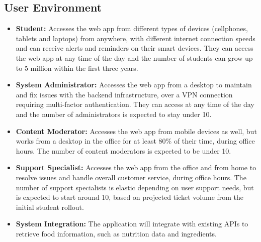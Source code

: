 \documentclass[10pt,letterpaper]{article}
\begin{document}
\subsection{User Environment}
\begin{itemize}[leftmargin=1.5em]
  \item \textbf{Student:} Accesses the web app from different types of devices (cellphones, tablets and laptops) from anywhere, with different internet connection speeds and can receive alerts and reminders on their smart devices. They can access the web app at any time of the day and the number of students can grow up to 5 million within the first three years.
  \item \textbf{System Administrator:} Accesses the web app from a desktop to maintain and fix issues with the backend infrastructure, over a VPN connection requiring multi-factor authentication. They can access at any time of the day and the number of administrators is expected to stay under 10.
  \item \textbf{Content Moderator:} Accesses the web app from mobile devices as well, but works from a desktop in the office for at least 80\% of their time, during office hours. The number of content moderators is expected to be under 10.
  \item \textbf{Support Specialist:} Accesses the web app from the office and from home to resolve issues and handle overall customer service, during office hours. The number of support specialists is elastic depending on user support needs, but is expected to start around 10, based on projected ticket volume from the initial student rollout.
  \item \textbf{System Integration:} The application will integrate with existing APIs to retrieve food information, such as nutrition data and ingredients.
\end{itemize}
\end{document}

